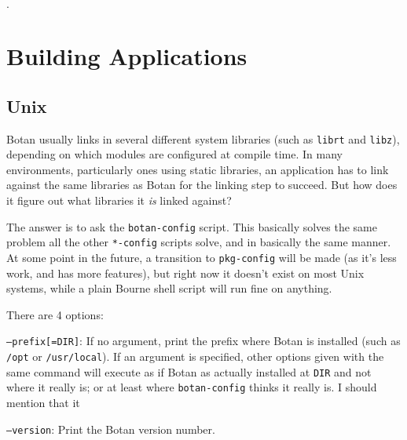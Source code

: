 \documentclass{article}
\newcommand{\filename}[1]{\texttt{#1}}
\begin{document}
\begin{list}{$\cdot$}
  \item {}

  \item {}

  \item {}

\end{list}

\pagebreak

\section{Building Applications}

\subsection{Unix}

Botan usually links in several different system libraries (such as
\texttt{librt} and \texttt{libz}), depending on which modules are configured at
compile time. In many environments, particularly ones using static libraries,
an application has to link against the same libraries as Botan for the linking
step to succeed. But how does it figure out what libraries it \emph{is} linked
against?

The answer is to ask the \filename{botan-config} script. This basically solves
the same problem all the other \filename{*-config} scripts solve, and in
basically the same manner. At some point in the future, a transition to
\filename{pkg-config} will be made (as it's less work, and has more features),
but right now it doesn't exist on most Unix systems, while a plain Bourne shell
script will run fine on anything.

There are 4 options:

\texttt{--prefix[=DIR]}: If no argument, print the prefix where Botan is
installed (such as \filename{/opt} or \filename{/usr/local}). If an argument is
specified, other options given with the same command will execute as if Botan
as actually installed at \filename{DIR} and not where it really is; or at least
where \filename{botan-config} thinks it really is. I should mention that it

\texttt{--version}: Print the Botan version number.
\end{document}
